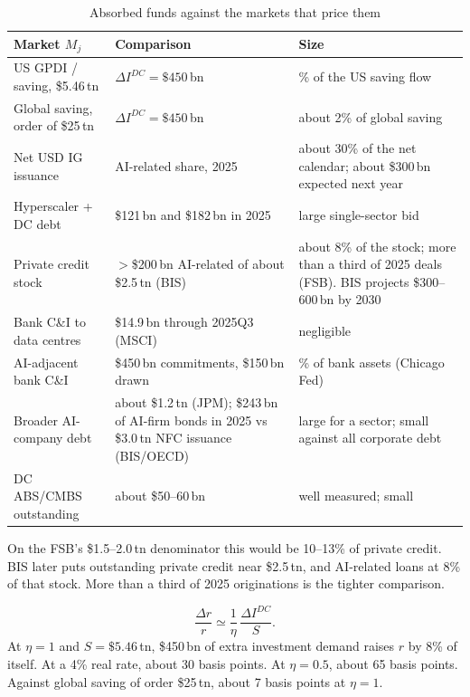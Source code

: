 \documentclass[11pt]{article}
\begin{document}
\begin{table}[H]
\centering
\caption{Absorbed funds against the markets that price them}
\label{tab:funds}
\begin{tabular}{>{\raggedright\arraybackslash}p{}
>{\raggedright\arraybackslash}p{}
>{\raggedright\arraybackslash}p{}}
\toprule
Market $M_j$ & Comparison & Size \\
\midrule
US GPDI / saving, \$5.46\,tn & $\Delta I^{DC}=\$450$\,bn & 8\% of the US
saving flow \\
Global saving, order of \$25\,tn & $\Delta I^{DC}=\$450$\,bn & about 2\%
of global saving \\
Net USD IG issuance & AI-related share, 2025 & about 30\% of the net
calendar; about \$300\,bn expected next year \\
Hyperscaler + DC debt & \$121\,bn and \$182\,bn in 2025 & large
single-sector bid \\
Private credit stock & $>$\$200\,bn AI-related of about \$2.5\,tn
(BIS) & about 8\% of the stock; more than a third of 2025 deals (FSB).
BIS projects \$300--600\,bn by 2030 \\
Bank C\&I to data centres & \$14.9\,bn through 2025Q3 (MSCI) & negligible \\
AI-adjacent bank C\&I & \$450\,bn commitments, \$150\,bn drawn & 0.8\% of
bank assets (Chicago Fed) \\
Broader AI-company debt & about \$1.2\,tn (JPM); \$243\,bn of AI-firm
bonds in 2025 vs \$3.0\,tn NFC issuance (BIS/OECD) & large for a sector;
small against all corporate debt \\
DC ABS/CMBS outstanding & about \$50--60\,bn & well measured; small \\
\bottomrule
\end{tabular}
\end{table}

On the FSB's \$1.5--2.0\,tn denominator this would be 10--13\% of private
credit. BIS later puts outstanding private credit near \$2.5\,tn, and
AI-related loans at 8\% of that stock. More than a third of 2025
originations is the tighter comparison.

\begin{equation}
\frac{\Delta r}{r}
\simeq
\frac{1}{\eta}\,\frac{\Delta I^{DC}}{S}.
\label{eq:rstar}
\end{equation}
At $\eta=1$ and $S=\$5.46$\,tn, \$450\,bn of extra investment demand raises
$r$ by 8\% of itself. At a 4\% real rate, about 30 basis points. At
$\eta=0.5$, about 65 basis points. Against global saving of order \$25\,tn,
about 7 basis points at $\eta=1$.
\end{document}
